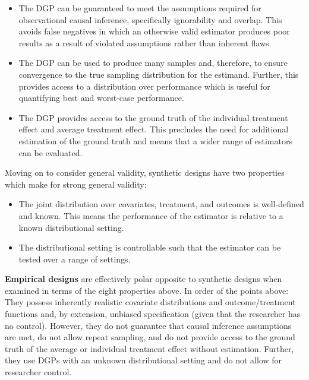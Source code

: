 \documentclass[../main.tex]{subfiles}
\begin{document}
\vspace{\baselineskip}
\begin{itemize}
    \item The DGP can be guaranteed to meet the assumptions required for observational causal inference, specifically ignorability and overlap. This avoids false negatives in which an otherwise valid estimator produces poor results as a result of violated assumptions rather than inherent flaws.\par


\vspace{\baselineskip}
    \item The DGP can be used to produce many samples and, therefore, to ensure convergence to the true sampling distribution for the estimand. Further, this provides access to a distribution over performance which is useful for quantifying best and worst-case performance.\par


\vspace{\baselineskip}
    \item The DGP provides access to the ground truth of the individual treatment effect and average treatment effect. This precludes the need for additional estimation of the ground truth and means that a wider range of estimators can be evaluated.
\end{itemize}\par


\vspace{\baselineskip}
Moving on to consider general validity, synthetic designs have two properties which make for strong general validity:\par


\vspace{\baselineskip}
\begin{itemize}
    \item The joint distribution over covariates, treatment, and outcomes is well-defined and known. This means the performance of the estimator is relative to a known distributional setting.\par


\vspace{\baselineskip}
    \item The distributional setting is controllable such that the estimator can be tested over a range of settings.
\end{itemize}\par


\vspace{\baselineskip}
\textbf{Empirical designs} are effectively polar opposite to synthetic designs when examined in terms of the eight properties above. In order of the points above: They possess inherently realistic covariate distributions and outcome/treatment functions and, by extension, unbiased specification (given that the researcher has no control). However, they do not guarantee that causal inference assumptions are met, do not allow repeat sampling, and do not provide access to the ground truth of the average or individual treatment effect without estimation. Further, they use DGPs with an unknown distributional setting and do not allow for researcher control.\par
\end{document}
